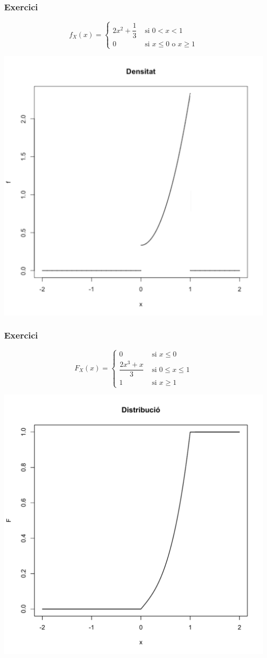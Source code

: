 \documentclass[12pt,t]{beamer}\usepackage[]{graphicx}\usepackage[]{color}
\renewcommand{\leq}{\leqslant}
\renewcommand{\geq}{\geqslant}
\theoremstyle{plain}
\theoremstyle{definition}
\begin{document}
\begin{frame}
\frametitle{Exercici}
\vspace*{-1cm}

$$
f_X(x)=\left\{\begin{array}{ll}
2 x^2+\dfrac{1}{3} & \mbox{ si } 0<x<1\\
0 & \mbox{ si $x\leq 0$ o $x\geq 1$}
\end{array}\right.
$$
\begin{center}
\includegraphics[width=0.7\linewidth]{dens-ex1.pdf}
\end{center}



\end{frame}



\begin{frame}
\frametitle{Exercici}
\vspace*{-1cm}

$$
F_X(x)=\left\{\begin{array}{lll}
0 & \mbox{ si $x\leq 0$}\\
\dfrac{2x^3+x}{3} & \mbox{ si } 0\leq x\leq 1\\
1 & \mbox{ si $x\geq 1$}
\end{array}\right.
$$
\begin{center}
\includegraphics[width=0.7\linewidth]{dist-ex1.pdf}
\end{center}



\end{frame}
\end{document}
